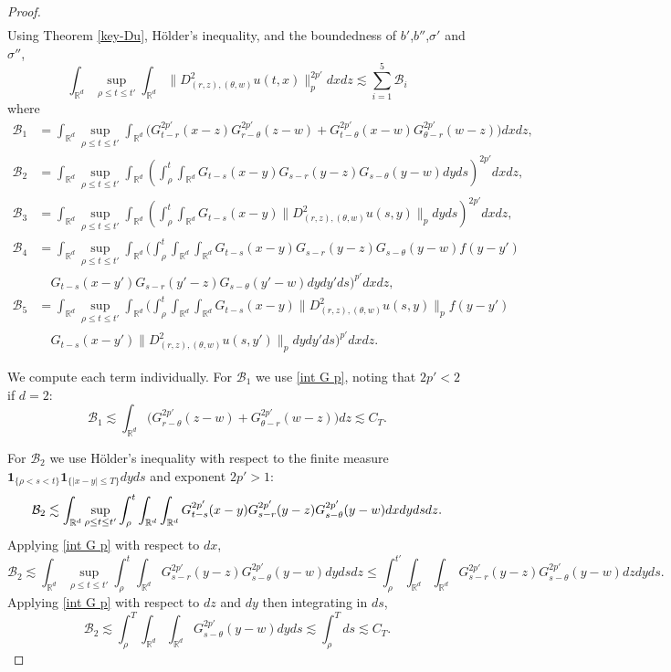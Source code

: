 \documentclass[12pt]{article}
\def\cB{\mathcal{B}}
\def\bR{\mathbb{R}}
\def\s{\sigma}
\newcommand{\les}{\lesssim}
\begin{document}
\begin{proof}
\begin{align*}
\end{align*}
Using Theorem \ref{key-Du}, H\"older's inequality, and the boundedness of $b'$,$b''$,$\s'$ and $\s''$, 
\[
 \int_{\bR^d} \sup_{\rho \leq t \leq t'} \int_{\bR^d} \|D^2_{(r,z),(\theta,w)}u(t,x)\|_{p}^{2p'} dx dz \les \sum_{i=1}^5 \cB_i
\]
where
\begin{align*}
 \cB_1 & = \int_{\bR^d} \sup_{\rho \leq t \leq t'} \int_{\bR^d} \Big(G^{2p'}_{t-r}(x-z)G^{2p'}_{r-\theta}(z-w) + G^{2p'}_{t-\theta}(x-w)G^{2p'}_{\theta-r}(w-z) \Big) dx dz, \\
 \cB_2 & = \int_{\bR^d} \sup_{\rho \leq t \leq t'} \int_{\bR^d} \left( \int_\rho^t \int_{\bR^d} G_{t-s}(x-y)G_{s-r}(y-z)G_{s-\theta}(y-w) dy ds\right)^{2p'} dx dz, \\
 \cB_3 & = \int_{\bR^d} \sup_{\rho \leq t \leq t'}  \int_{\bR^d} \left( \int_\rho^t \int_{\bR^d} G_{t-s}(x-y) \|D^2_{(r,z),(\theta,w)}u(s,y)\|_{p}  dy ds\right)^{2p'} dx dz, \\
 \cB_4 & = \int_{\bR^d} \sup_{\rho \leq t \leq t'}  \int_{\bR^d} \bigg( \int_\rho^t \int_{\bR^d} \int_{\bR^d} G_{t-s}(x-y)G_{s-r}(y-z)G_{s-\theta}(y-w) f(y-y') \\
 & \quad G_{t-s}(x-y')G_{s-r}(y'-z)G_{s-\theta}(y'-w) dydy' ds\bigg)^{p'} dx dz, \\
 \cB_5 & = \int_{\bR^d} \sup_{\rho \leq t \leq t'}  \int_{\bR^d} \bigg( \int_\rho^t \int_{\bR^d} \int_{\bR^d} G_{t-s}(x-y) \|D^2_{(r,z),(\theta,w)}u(s,y)\|_{p} f(y-y') \\
 & \quad G_{t-s}(x-y') \|D^2_{(r,z),(\theta,w)}u(s,y')\|_{p} dy dy' ds\bigg)^{p'} dx dz. 
\end{align*}

We compute each term individually. For $\cB_1$ we use \eqref{int G p}, noting that $2p'<2$ if $d=2$:
\[
\cB_1 \les \int_{\bR^d} \Big( G^{2p'}_{r-\theta}(z-w) + G^{2p'}_{\theta-r}(w-z)\Big) dz  \les C_T.
\]

For $\cB_2$ we use H\"older's inequality with respect to the finite measure $\mathbf 1_{\{\rho < s < t\}} \mathbf 1_{\{|x-y| \leq T\}}dyds$ and exponent $2p' > 1$:
\[
 \cB_2 \les \int_{\bR^d} \sup_{\rho \leq t \leq t'}  \int_\rho^t \int_{\bR^d} \int_{\bR^d}  G^{2p'}_{t-s}(x-y)G^{2p'}_{s-r}(y-z)G^{2p'}_{s-\theta}(y-w) dx dy ds dz. \\
\]
Applying \eqref{int G p} with respect to $dx$, 
\[
 \cB_2 \les \int_{\bR^d} \sup_{\rho \leq t \leq t'}  \int_\rho^t \int_{\bR^d}G^{2p'}_{s-r}(y-z)G^{2p'}_{s-\theta}(y-w) dy ds dz \leq \int_\rho^{t'} \int_{\bR^d} \int_{\bR^d} G^{2p'}_{s-r}(y-z)G^{2p'}_{s-\theta}(y-w) dz dy ds.
\]
 Applying \eqref{int G p} with respect to $dz$ and $dy$ then integrating in $ds$, 
\[
 \cB_2 \les \int_\rho^T \int_{\bR^d} \int_{\bR^d} G^{2p'}_{s-\theta}(y-w) dy ds \les \int_\rho^T ds \les C_T.
\]


\end{proof}
\end{document}
